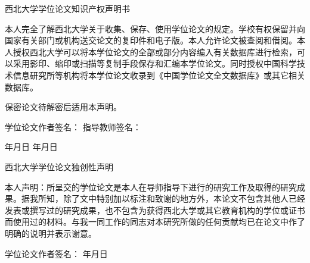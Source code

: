 
\newpage
\thispagestyle{empty}

\begin{center}
    \sanhao\heiti 西北大学学位论文知识产权声明书
\end{center}
\vspace{1.5em}

\noindent 本人完全了解西北大学关于收集、保存、使用学位论文的规定。学校有权保留并向国家有关部门或机构送交论文的复印件和电子版。本人允许论文被查阅和借阅。本人授权西北大学可以将本学位论文的全部或部分内容编入有关数据库进行检索，可以采用影印、缩印或扫描等复制手段保存和汇编本学位论文。同时授权中国科学技术信息研究所等机构将本学位论文收录到《中国学位论文全文数据库》或其它相关数据库。

\vspace{0.5em}
\noindent 保密论文待解密后适用本声明。

\vspace{2em}
\noindent 学位论文作者签名：\underline{\hspace{4cm}} \qquad 指导教师签名：\underline{\hspace{4cm}}

\vspace{0.5em}
\noindent \hspace{6.5cm} 年\quad 月\quad 日 \hspace{2cm} 年\quad 月\quad 日

\newpage
\thispagestyle{empty}

\begin{center}
    \sanhao\heiti 西北大学学位论文独创性声明
\end{center}
\vspace{1.5em}

\noindent 本人声明：所呈交的学位论文是本人在导师指导下进行的研究工作及取得的研究成果。据我所知，除了文中特别加以标注和致谢的地方外，本论文不包含其他人已经发表或撰写过的研究成果，也不包含为获得西北大学或其它教育机构的学位或证书而使用过的材料。与我一同工作的同志对本研究所做的任何贡献均已在论文中作了明确的说明并表示谢意。

\vspace{2em}
\noindent 学位论文作者签名：\underline{\hspace{4cm}} \hspace{2cm} 年\quad 月\quad 日

\newpage



